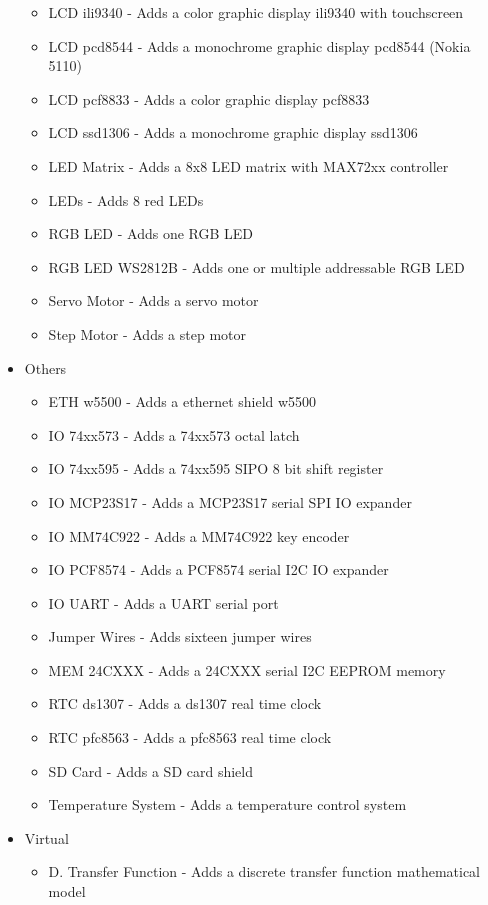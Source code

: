 \begin{itemize}
\begin{itemize}
   \item LCD ili9340 - Adds a color graphic display ili9340 with touchscreen 
   \item LCD pcd8544 - Adds a monochrome graphic display pcd8544 (Nokia 5110)
   \item LCD pcf8833 - Adds a color graphic display pcf8833
   \item LCD ssd1306 - Adds a monochrome graphic display ssd1306
   \item LED Matrix - Adds a 8x8 LED matrix with MAX72xx controller 
   \item LEDs - Adds 8 red LEDs
   \item RGB LED - Adds one RGB LED 
   \item RGB LED WS2812B - Adds one or multiple addressable RGB LED 
   \item Servo Motor - Adds a servo motor
   \item Step Motor - Adds a step motor
 \end{itemize}
 \item{Others}
  \begin{itemize}
   \item ETH w5500 - Adds a ethernet shield w5500
   \item IO 74xx573 - Adds a 74xx573 octal latch
   \item IO 74xx595 - Adds a 74xx595 SIPO 8 bit shift register
   \item IO MCP23S17 - Adds a MCP23S17 serial SPI IO expander
   \item IO MM74C922 - Adds a MM74C922 key encoder
   \item IO PCF8574 - Adds a PCF8574 serial I2C IO expander
   \item IO UART - Adds a UART serial port 
   \item Jumper Wires - Adds sixteen jumper wires 
   \item MEM 24CXXX - Adds a 24CXXX serial I2C EEPROM  memory
   \item RTC ds1307 - Adds a ds1307 real time clock 
   \item RTC pfc8563 - Adds a pfc8563 real time clock
   \item SD Card - Adds a SD card shield
   \item Temperature System - Adds a temperature control system
  \end{itemize}
\item{Virtual}
  \begin{itemize}
  \item D. Transfer Function - Adds a discrete transfer function mathematical model

\end{itemize}
\end{itemize}
